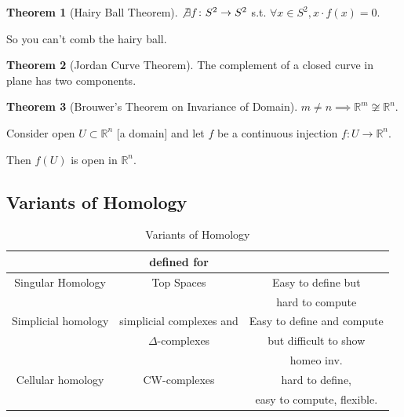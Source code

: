 \documentclass{article}
\theoremstyle{definition}
\newtheorem{theorem}{Theorem}
\begin{document}
    \begin{theorem}
        [Hairy Ball Theorem]


        \(\not\exists f\colon S^2 \to S^2\) s.t. \(\forall x\in S^2, x \cdot f(x) = 0\).
        
        So you can't comb the hairy ball.
    \end{theorem}
    
    \begin{theorem}
        [Jordan Curve Theorem]


        The complement of a closed curve in plane has two components.


    \end{theorem}

    \begin{theorem}
        [Brouwer's Theorem on Invariance of Domain]

        \(m \neq n \implies \mathbb{R}^m \not\cong \mathbb{R}^n\).

        Consider open \(U \subset \mathbb{R}^n\) [a domain] and let \(f\) be a continuous injection \(f\colon U \to \mathbb{R}^n\).

        Then \(f(U)\) is open in \(\mathbb{R}^n\).
    \end{theorem}

    \subsection*{Variants of Homology}

    \begin{table}[H]
        \centering
        \begin{tabular}{c|c|c}
            \toprule
                 & defined for &  \\
            \midrule
                Singular Homology &Top Spaces & Easy to define  but \\ & & hard to compute \\ \midrule
                Simplicial homology & simplicial complexes and  & Easy to define and compute \\ & \(\Delta\)-complexes & but difficult to show \\ & & homeo inv. \\ \midrule
                Cellular homology & CW-complexes & hard to define, \\ & & easy to compute, flexible. \\
            \bottomrule
        \end{tabular}
        \caption{Variants of Homology}
    \end{table}
\end{document}
